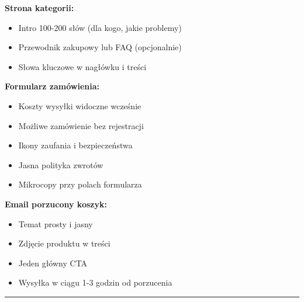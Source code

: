 \documentclass[
  12pt,
  a4paper,
  twoside,
  openright,
  12pt,
  DIV=12,
  BCOR=12mm]{scrbook}
\providecommand{\tightlist}{%
  \setlength{\itemsep}{0pt}\setlength{\parskip}{0pt}}\usepackage{longtable,booktabs,array}
\newcommand{\decoline}{%
  \begin{center}
    \textcolor{bordergray}{\rule{0.3\textwidth}{0.5pt}}
  \end{center}
}
\begin{document}
\textbf{Strona kategorii:}

\begin{itemize}
\tightlist
\item[$\square$]
  Intro 100-200 słów (dla kogo, jakie problemy)
\item[$\square$]
  Przewodnik zakupowy lub FAQ (opcjonalnie)
\item[$\square$]
  Słowa kluczowe w nagłówku i treści
\end{itemize}

\textbf{Formularz zamówienia:}

\begin{itemize}
\tightlist
\item[$\square$]
  Koszty wysyłki widoczne wcześnie
\item[$\square$]
  Możliwe zamówienie bez rejestracji
\item[$\square$]
  Ikony zaufania i bezpieczeństwa
\item[$\square$]
  Jasna polityka zwrotów
\item[$\square$]
  Mikrocopy przy polach formularza
\end{itemize}

\textbf{Email porzucony koszyk:}

\begin{itemize}
\tightlist
\item[$\square$]
  Temat prosty i jasny
\item[$\square$]
  Zdjęcie produktu w treści
\item[$\square$]
  Jeden główny CTA
\item[$\square$]
  Wysyłka w ciągu 1-3 godzin od porzucenia
\end{itemize}

\decoline
\end{document}
